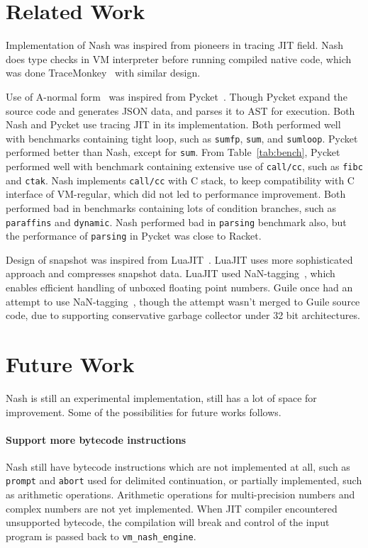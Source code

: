 \documentclass[preprint, 10pt]{sigplanconf}
\begin{document}
\section{Related Work}
\label{sec:related}
Implementation of Nash was inspired from pioneers in tracing JIT field. Nash
does type checks in VM interpreter before running compiled native code, which
was done TraceMonkey~\cite{gal2009trace} with similar design.

Use of A-normal form~\cite{flanagan1993essence} was inspired from
Pycket~\cite{bauman2015pycket}. Though Pycket expand the source code and
generates JSON data, and parses it to AST for execution.  Both Nash and Pycket
use tracing JIT in its implementation. Both performed well with benchmarks
containing tight loop, such as \texttt{sumfp}, \texttt{sum}, and
\texttt{sumloop}. Pycket performed better than Nash, except for
\texttt{sum}. From Table~\hyperref[tab:bench]{\ref{tab:bench}}, Pycket performed
well with benchmark containing extensive use of \texttt{call/cc}, such as
\texttt{fibc} and \texttt{ctak}. Nash implements \texttt{call/cc} with C stack,
to keep compatibility with C interface of VM-regular, which did not led to
performance improvement. Both performed bad in benchmarks containing lots of
condition branches, such as \texttt{paraffins} and \texttt{dynamic}. Nash
performed bad in \texttt{parsing} benchmark also, but the performance of
\texttt{parsing} in Pycket was close to Racket.

Design of snapshot was inspired from LuaJIT~\cite{pall2016luajit}. LuaJIT uses
more sophisticated approach and compresses snapshot data. LuaJIT used
NaN-tagging~\cite{pall2009ip}, which enables efficient handling of unboxed
floating point numbers. Guile once had an attempt to use
NaN-tagging~\cite{wingo2011value}, though the attempt wasn't merged to Guile
source code, due to supporting conservative garbage collector under 32 bit
architectures.

\section{Future Work}
\label{sec:future}

Nash is still an experimental implementation, still has a lot of space for
improvement. Some of the possibilities for future works follows.

\paragraph{Support more bytecode instructions} Nash still have bytecode
instructions which are not implemented at all, such as \texttt{prompt} and
\texttt{abort} used for delimited continuation, or partially implemented, such
as arithmetic operations. Arithmetic operations for multi-precision numbers and
complex numbers are not yet implemented. When JIT compiler encountered
unsupported bytecode, the compilation will break and control of the input
program is passed back to \texttt{vm\_nash\_engine}.
\end{document}
